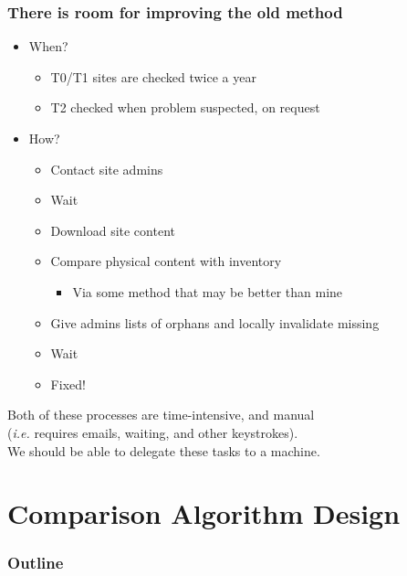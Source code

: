 \documentclass{beamer}
\begin{document}
\begin{frame}
  \frametitle{There is room for improving the old method}

  \begin{itemize}
  \item When?
    \begin{itemize}
    \item T0/T1 sites are checked twice a year
    \item T2 checked when problem suspected, on request
    \end{itemize}
  \item How?
    \begin{itemize}
    \item Contact site admins
    \item Wait
    \item Download site content
    \item Compare physical content with inventory
      \begin{itemize}
      \item Via some method that may be better than mine
      \end{itemize}
    \item Give admins lists of orphans and locally invalidate missing
    \item Wait
    \item Fixed!
    \end{itemize}
  \end{itemize}

  Both of these processes are time-intensive, and manual \\
  (\emph{i.e.} requires emails, waiting, and other keystrokes). \\
  We should be able to delegate these tasks to a machine.

\end{frame}

\section{Comparison Algorithm Design}

\begin{frame}
  \frametitle{Outline}
  \tableofcontents[currentsection]
\end{frame}
\end{document}
